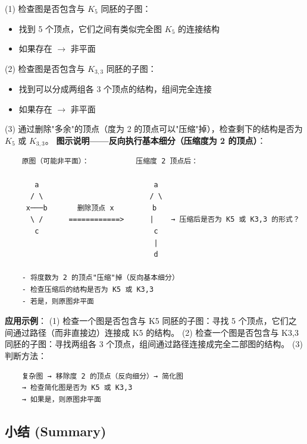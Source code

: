 \documentclass[10pt,a4paper,openany]{ctexbook}
\theoremstyle{definition}
\theoremstyle{remark}
\begin{document}
(1) 检查图是否包含与 $K_5$ 同胚的子图：
\begin{itemize}
\item 找到 5 个顶点，它们之间有类似完全图 $K_5$ 的连接结构
\item 如果存在 $\rightarrow$ 非平面

\end{itemize}

(2) 检查图是否包含与 $K_{3,3}$ 同胚的子图：
\begin{itemize}
\item 找到可以分成两组各 3 个顶点的结构，组间完全连接
\item 如果存在 $\rightarrow$ 非平面

\end{itemize}

(3) 通过删除"多余"的顶点（度为 2 的顶点可以"压缩"掉），检查剩下的结构是否为 $K_5$ 或 $K_{3,3}$。
\textbf{图示说明——反向执行基本细分（压缩度为 2 的顶点）}：
{\footnotesize\begin{verbatim}
    原图（可能非平面）：           压缩度 2 顶点后：
    
       a                           a
      / \                         / \
     x───b       删除顶点 x         b
      \ /      ============>      |    → 压缩后是否为 K5 或 K3,3 的形式？
       c                           c
                                   |
                                   d
    
    - 将度数为 2 的顶点"压缩"掉（反向基本细分）
    - 检查压缩后的结构是否为 K5 或 K3,3
    - 若是，则原图非平面
\end{verbatim}}

\textbf{应用示例}：
(1) 检查一个图是否包含与 K5 同胚的子图：寻找 5 个顶点，它们之间通过路径（而非直接边）连接成 K5 的结构。
(2) 检查一个图是否包含与 K3,3 同胚的子图：寻找两组各 3 个顶点，组间通过路径连接成完全二部图的结构。
(3) 判断方法：
{\footnotesize\begin{verbatim}
    复杂图 → 移除度 2 的顶点（反向细分）→ 简化图
    → 检查简化图是否为 K5 或 K3,3
    → 如果是，则原图非平面
\end{verbatim}}

\vspace{-2pt}

\subsection{小结 (Summary)}
\end{document}

